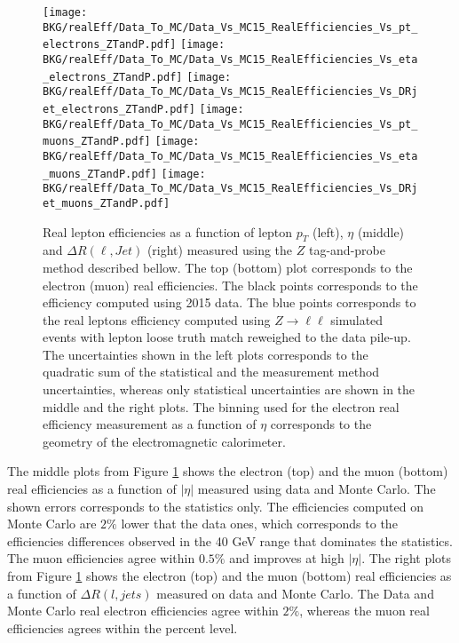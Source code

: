 				 
	\begin{figure}[!htb]
	  \begin{center} 
	   \texttt{[image: BKG/realEff/Data\_To\_MC/Data\_Vs\_MC15\_RealEfficiencies\_Vs\_pt\_electrons\_ZTandP.pdf]} 
	   \texttt{[image: BKG/realEff/Data\_To\_MC/Data\_Vs\_MC15\_RealEfficiencies\_Vs\_eta\_electrons\_ZTandP.pdf]} 
	   \texttt{[image: BKG/realEff/Data\_To\_MC/Data\_Vs\_MC15\_RealEfficiencies\_Vs\_DRjet\_electrons\_ZTandP.pdf]} 
	   \texttt{[image: BKG/realEff/Data\_To\_MC/Data\_Vs\_MC15\_RealEfficiencies\_Vs\_pt\_muons\_ZTandP.pdf]} 	
	   \texttt{[image: BKG/realEff/Data\_To\_MC/Data\_Vs\_MC15\_RealEfficiencies\_Vs\_eta\_muons\_ZTandP.pdf]}
	   \texttt{[image: BKG/realEff/Data\_To\_MC/Data\_Vs\_MC15\_RealEfficiencies\_Vs\_DRjet\_muons\_ZTandP.pdf]}
	   \caption{\label{fig:Data_Vs_MC_Real_Eff} Real lepton efficiencies as a function of lepton $p_{T}$ (left), $\eta$ (middle) and $\Delta R(\ell,Jet)$ (right) measured using the $Z$ tag-and-probe method described bellow. The top (bottom) plot corresponds to the electron (muon) real efficiencies. The black points corresponds to the efficiency computed using 2015 data. The blue points corresponds to the real leptons efficiency computed using $Z\rightarrow \ell\ell$ simulated events with lepton loose truth match reweighed to the data pile-up. The uncertainties shown in the left plots corresponds to the quadratic sum of the statistical and the measurement method uncertainties, whereas only statistical uncertainties are shown in the middle and the right plots. The binning used for the electron real efficiency measurement as a function of $\eta$ corresponds to the geometry of the electromagnetic calorimeter.}
	  \end{center}
	\end{figure}	
	
	The middle plots from Figure \ref{fig:Data_Vs_MC_Real_Eff} shows the electron (top) and the muon (bottom) real efficiencies as a function of $|\eta|$ measured using data and Monte Carlo. The shown errors corresponds to the statistics only. The efficiencies computed on Monte Carlo are $2\%$ lower that the data ones, which corresponds to the efficiencies differences observed in the 40 GeV \pt range that dominates the statistics. The muon efficiencies agree within $0.5\%$ and improves at high $|\eta|$.
	The right plots from Figure \ref{fig:Data_Vs_MC_Real_Eff} shows the electron (top) and the muon (bottom) real efficiencies as a function of $\Delta R(l,jets)$ measured on data and Monte Carlo. The Data and Monte Carlo real electron efficiencies agree within $2\%$, whereas the muon real efficiencies agrees within the percent level.
	
